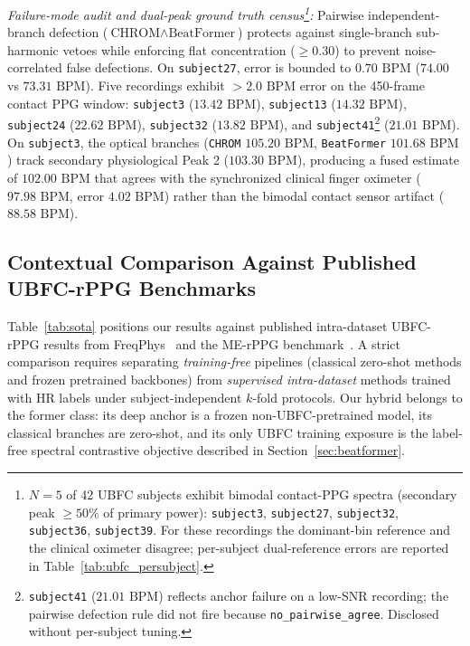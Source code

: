 \documentclass[conference]{IEEEtran}
\begin{document}
\noindent\textit{Failure-mode audit and dual-peak ground truth census\footnote{$N = 5$ of 42 UBFC subjects exhibit bimodal contact-PPG spectra (secondary peak $\ge 50\%$ of primary power): \texttt{subject3}, \texttt{subject27}, \texttt{subject32}, \texttt{subject36}, \texttt{subject39}. For these recordings the dominant-bin reference and the clinical oximeter disagree; per-subject dual-reference errors are reported in Table~\ref{tab:ubfc_persubject}.}:} Pairwise independent-branch defection ($\text{CHROM} \wedge \text{BeatFormer}$) protects against single-branch sub-harmonic vetoes while enforcing flat concentration ($\ge 0.30$) to prevent noise-correlated false defections. On \texttt{subject27}, error is bounded to $0.70\text{ BPM}$ ($74.00$ vs $73.31\text{ BPM}$). Five recordings exhibit $>2.0\text{ BPM}$ error on the 450-frame contact PPG window: \texttt{subject3} ($13.42\text{ BPM}$), \texttt{subject13} ($14.32\text{ BPM}$), \texttt{subject24} ($22.62\text{ BPM}$), \texttt{subject32} ($13.82\text{ BPM}$), and \texttt{subject41}\footnote{\texttt{subject41} ($21.01\text{ BPM}$) reflects anchor failure on a low-SNR recording; the pairwise defection rule did not fire because \texttt{no\_pairwise\_agree}. Disclosed without per-subject tuning.} ($21.01\text{ BPM}$). On \texttt{subject3}, the optical branches (\texttt{CHROM} $105.20\text{ BPM}$, \texttt{BeatFormer} $101.68\text{ BPM}$) track secondary physiological Peak 2 ($103.30\text{ BPM}$), producing a fused estimate of $102.00\text{ BPM}$ that agrees with the synchronized clinical finger oximeter ($97.98\text{ BPM}$, error $4.02\text{ BPM}$) rather than the bimodal contact sensor artifact ($88.58\text{ BPM}$).

\subsection{Contextual Comparison Against Published UBFC-rPPG Benchmarks}

Table~\ref{tab:sota} positions our results against published intra-dataset
UBFC-rPPG results from FreqPhys~\cite{qian2026freqphys} and the ME-rPPG
benchmark~\cite{wang2025merppg}. A strict comparison requires separating
\emph{training-free} pipelines (classical zero-shot methods and frozen
pretrained backbones) from \emph{supervised intra-dataset} methods trained
with HR labels under subject-independent $k$-fold protocols. Our hybrid
belongs to the former class: its deep anchor is a frozen non-UBFC-pretrained
model, its classical branches are zero-shot, and its only UBFC training
exposure is the label-free spectral contrastive objective described in
Section~\ref{sec:beatformer}.
\end{document}
